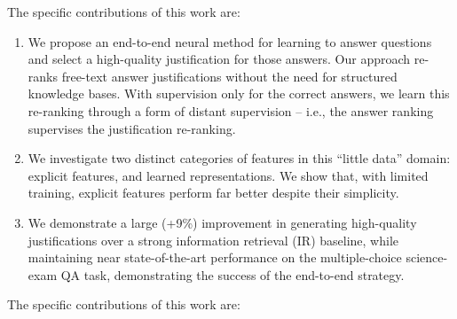 The specific contributions of this work are:
\begin{enumerate}
\item We propose an end-to-end neural method for learning to answer questions and select a high-quality justification for those answers. 
Our approach re-ranks free-text answer justifications without the need for structured knowledge bases. 
With supervision only for the correct answers, we learn this re-ranking through a form of distant supervision -- i.e., the answer ranking supervises the justification re-ranking. 

\item We investigate two distinct categories of features in this ``little data'' domain: explicit features, and learned representations. We show that, with limited training, explicit features perform far better despite their simplicity. 

\item We demonstrate a large (+9\%) improvement in generating high-quality justifications over a strong information retrieval (IR) baseline, while maintaining near state-of-the-art performance on the multiple-choice science-exam QA task, demonstrating the success of the end-to-end strategy.
\end{enumerate}

The specific contributions of this work are: 

